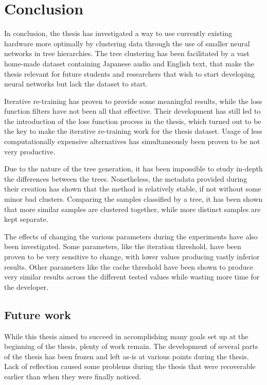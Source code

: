 \chapter{Conclusion}

In conclusion, the thesis has investigated a way to use currently existing hardware more optimally by clustering data through the use of smaller neural networks in tree hierarchies.
The tree clustering has been facilitated by a vast home-made dataset containing Japanese audio and English text, that make the thesis relevant for future students and researchers that wish to start developing neural networks but lack the dataset to start.

Iterative re-training has proven to provide some meaningful results, while the loss function filters have not been all that effective.
Their development has still led to the introduction of the loss function process in the thesis, which turned out to be the key to make the iterative re-training work for the thesis dataset.
Usage of less computationally expensive alternatives has simultaneously been proven to be not very productive.

Due to the nature of the tree generation, it has been impossible to study in-depth the differences between the trees.
Nonetheless, the metadata provided during their creation has shown that the method is relatively stable, if not without some minor bad clusters.
Comparing the samples classified by a tree, it has been shown that more similar samples are clustered together, while more distinct samples are kept separate.

The effects of changing the various parameters during the experiments have also been investigated.
Some parameters, like the iteration threshold, have been proven to be very sensitive to change, with lower values producing vastly inferior results.
Other parameters like the cache threshold have been shown to produce very similar results across the different tested values while wasting more time for the developer.

\section{Future work}
While this thesis aimed to succeed in accomplishing many goals set up at the beginning of the thesis, plenty of work remain.
The development of several parts of the thesis has been frozen and left as-is at various points during the thesis.
Lack of reflection caused some problems during the thesis that were recoverable earlier than when they were finally noticed.

